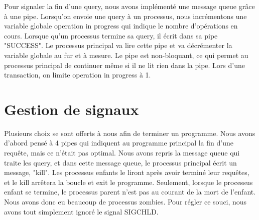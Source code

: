 \documentclass[utf8]{article}
\begin{document}
\indent{}
\par
Pour signaler la fin d'une query, nous avons implémenté une message queue grâce à une pipe. Lorsqu'on envoie 
une query à un processus, nous incrémentons une variable globale operation in progress qui indique le nombre d'opérations en cours.
Lorsque qu'un processus termine sa query, il écrit dans sa pipe "SUCCESS". Le processus principal va lire cette pipe et va décrémenter
la variable globale au fur et à mesure. Le pipe est non-bloquant, ce qui permet au processus principal de continuer
même si il ne lit rien dans la pipe. Lors d'une transaction, on limite operation in progress à 1.

\section{Gestion de signaux}
\indent{}
\par
Plusieurs choix se sont offerts à nous afin de terminer un programme. Nous avons d'abord pensé à 4 pipes qui indiquent au programme principal 
la fin d'une requête, mais ce n'était pas optimal.
Nous avons repris la message queue qui traite les query, et dans 
cette message queue, le processus principal écrit un message, "kill". Les processus enfants le liront après avoir terminé leur requêtes,
et le kill arrêtera la boucle et exit le programme.
Seulement, lorsque le processus enfant se termine, le processus parent n'est pas au courant de la mort de l'enfant. Nous avons donc eu 
beaucoup de processus zombies. Pour régler ce souci, nous avons tout simplement ignoré le signal SIGCHLD.
\end{document}
